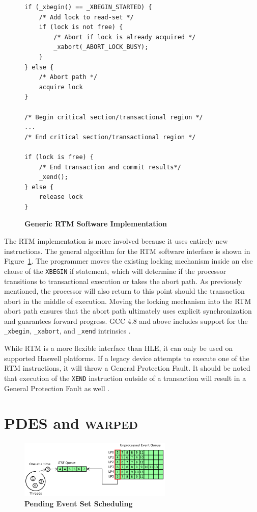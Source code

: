 \documentclass{sig-alternate}
\begin{document}
\begin{figure}
\begin{verbatim}
if (_xbegin() == _XBEGIN_STARTED) {
    /* Add lock to read-set */
    if (lock is not free) {
        /* Abort if lock is already acquired */
        _xabort(_ABORT_LOCK_BUSY);
    }
} else {
    /* Abort path */
    acquire lock
}

/* Begin critical section/transactional region */
...
/* End critical section/transactional region */

if (lock is free) {
    /* End transaction and commit results*/
    _xend();
} else {
    release lock
}
\end{verbatim}
    \caption{\textbf{Generic RTM Software Implementation}}\label{fig:rtm_interface}
\end{figure}

The RTM implementation is more involved because it uses entirely new instructions.  The
general algorithm for the RTM software interface is shown in
Figure~\ref{fig:rtm_interface}.  The programmer moves the existing locking mechanism
inside an else clause of the \texttt{XBEGIN} if statement, which will determine if the
processor transitions to transactional execution or takes the abort path.  As previously
mentioned, the processor will also return to this point should the transaction abort in
the middle of execution.  Moving the locking mechanism into the RTM abort path ensures
that the abort path ultimately uses explicit synchronization and guarantees forward
progress.  GCC 4.8 and above includes support for the \texttt{\_xbegin},
\texttt{\_xabort}, and \texttt{\_xend} intrinsics \cite{gcc}.

While RTM is a more flexible interface than HLE, it can only be used on supported Haswell
platforms.  If a legacy device attempts to execute one of the RTM instructions, it will
throw a General Protection Fault.  It should be noted that execution of the \texttt{XEND}
instruction outside of a transaction will result in a General Protection Fault as well
\cite{intel_opt_man}.

\section{PDES and \textsc{warped}}\label{warped}

\begin{figure}
    \centering
    \graphicspath{ {./figures/} }
    \includegraphics[width=0.65\textwidth,keepaspectratio]{single_ltsf_queue}
    \caption{\textbf{Pending Event Set Scheduling}}\label{fig:singleLTSFqueue}
\end{figure}
\end{document}
